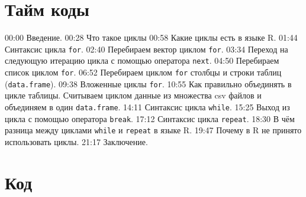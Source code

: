 \documentclass[
]{book}
\begin{document}
\hypertarget{ux442ux430ux439ux43c-ux43aux43eux434ux44b}{%
\section{Тайм коды}\label{ux442ux430ux439ux43c-ux43aux43eux434ux44b}}

00:00 Введение.
00:28 Что такое циклы
00:58 Какие циклы есть в языке R.
01:44 Синтаксис цикла \texttt{for}.
02:40 Перебираем вектор циклом \texttt{for}.
03:34 Переход на следующую итерацию цикла с помощью оператора \texttt{next}.
04:50 Перебираем список циклом \texttt{for}.
06:52 Перебираем циклом \texttt{for} столбцы и строки таблиц (\texttt{data.frame}).
09:38 Вложенные циклы \texttt{for}.
10:55 Как правильно объединять в цикле таблицы. Считываем циклом данные из множества csv файлов и объединяем в один \texttt{data.frame}.
14:11 Синтаксис цикла \texttt{while}.
15:25 Выход из цикла с помощью оператора \texttt{break}.
17:12 Синтаксис цикла \texttt{repeat}.
18:30 В чём разница между циклами \texttt{while} и \texttt{repeat} в языке R.
19:47 Почему в R не принято использовать циклы.
21:17 Заключение.

\hypertarget{ux43aux43eux434}{%
\section{Код}\label{ux43aux43eux434}}
\end{document}
